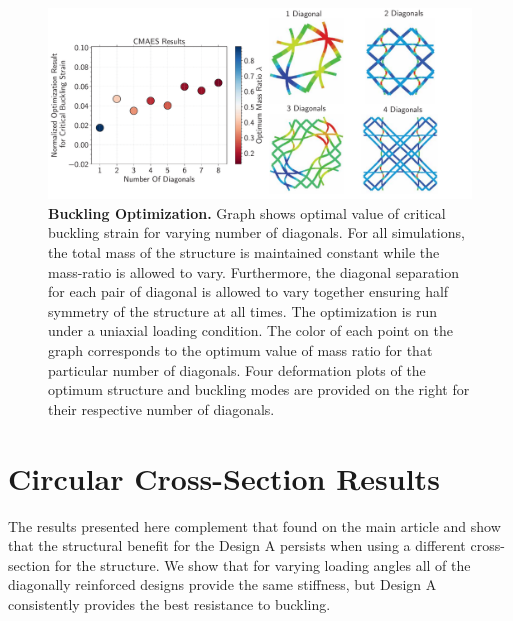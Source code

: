 \documentclass[10pt,twoside]{fernandes_supp}
\begin{document}
\begin{figure}
    \centering
    \includegraphics[width=0.9\linewidth]{SFig6.pdf}
    \caption{{\bf Buckling Optimization.} Graph shows optimal value of critical buckling strain for varying number of diagonals. For all simulations, the total mass of the structure is maintained constant while the mass-ratio is allowed to vary. Furthermore, the diagonal separation for each pair of diagonal is allowed to vary together ensuring half symmetry of the structure at all times. The optimization is run under a uniaxial loading condition. The color of each point on the graph corresponds to the optimum value of mass ratio for that particular number of diagonals. Four deformation plots of the optimum structure and buckling modes are provided on the right for their respective number of diagonals.}
    \label{BucklingOptimization}
\end{figure}

\section{Circular Cross-Section Results}
The results presented here complement that found on the main article and show that the structural benefit for the Design A persists when using a different cross-section for the structure. We show that for varying loading angles all of the diagonally reinforced designs provide the same stiffness, but Design A consistently provides the best resistance to buckling. 
\end{document}
